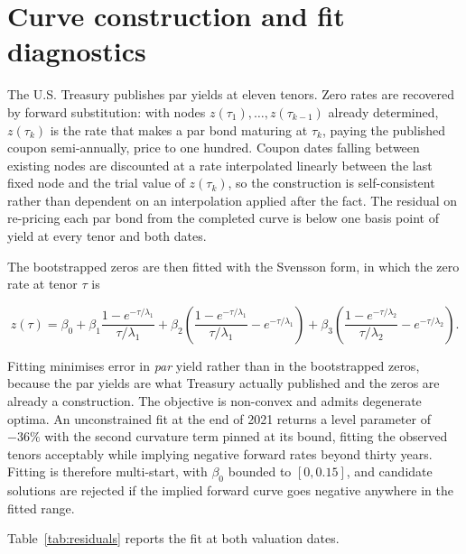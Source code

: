 \appendix

\section{Curve construction and fit diagnostics}
\label{app:curve}

The U.S. Treasury publishes par yields at eleven tenors. Zero rates are recovered by
forward substitution: with nodes $z(\tau_1), \dots, z(\tau_{k-1})$ already determined,
$z(\tau_k)$ is the rate that makes a par bond maturing at $\tau_k$, paying the
published coupon semi-annually, price to one hundred. Coupon dates falling between
existing nodes are discounted at a rate interpolated linearly between the last fixed
node and the trial value of $z(\tau_k)$, so the construction is self-consistent
rather than dependent on an interpolation applied after the fact. The residual on
re-pricing each par bond from the completed curve is below one basis point of yield at
every tenor and both dates.

The bootstrapped zeros are then fitted with the Svensson form, in which the zero rate
at tenor $\tau$ is

\begin{equation}
z(\tau) = \beta_0
 + \beta_1 \frac{1 - e^{-\tau/\lambda_1}}{\tau/\lambda_1}
 + \beta_2 \left( \frac{1 - e^{-\tau/\lambda_1}}{\tau/\lambda_1} - e^{-\tau/\lambda_1} \right)
 + \beta_3 \left( \frac{1 - e^{-\tau/\lambda_2}}{\tau/\lambda_2} - e^{-\tau/\lambda_2} \right).
\label{eq:nss}
\end{equation}

Fitting minimises error in \emph{par} yield rather than in the bootstrapped zeros,
because the par yields are what Treasury actually published and the zeros are already
a construction. The objective is non-convex and admits degenerate optima. An
unconstrained fit at the end of 2021 returns a level parameter of $-36\%$ with the
second curvature term pinned at its bound, fitting the observed tenors acceptably
while implying negative forward rates beyond thirty years. Fitting is therefore
multi-start, with $\beta_0$ bounded to $[0, 0.15]$, and candidate solutions are
rejected if the implied forward curve goes negative anywhere in the fitted range.

Table~\ref{tab:residuals} reports the fit at both valuation dates.

